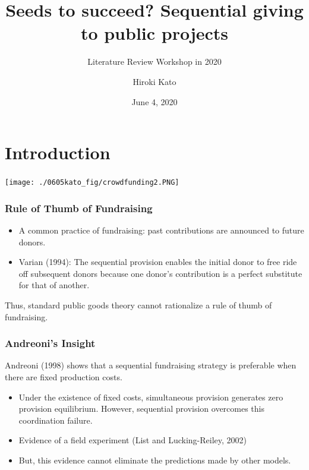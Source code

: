 \documentclass[unicode,12pt]{beamer}
\title{Seeds to succeed? Sequential giving to public projects}
\subtitle{Literature Review Workshop in 2020}
\author{Hiroki Kato}
\date{June 4, 2020}
\begin{document}
    \maketitle

    \section{Introduction}

    \begin{frame}
        \frametitle{}

        \centerline{\texttt{[image: ./0605kato\_fig/crowdfunding2.PNG]}}
        
    \end{frame}

    \begin{frame}
        \frametitle{Rule of Thumb of Fundraising}
    
        \begin{itemize}
            \item A common practice of fundraising: past contributions are announced to future donors.
            \item Varian (1994): The sequential provision enables the initial donor to free ride off subsequent donors because one donor's contribution is a perfect substitute for that of another. 
        \end{itemize}
        Thus, standard public goods theory cannot rationalize a rule of thumb of fundraising.
    
    \end{frame}

    \begin{frame}
        \frametitle{Andreoni's Insight}
    
        Andreoni (1998) shows that a sequential fundraising strategy is preferable when there are fixed production costs.
        \begin{itemize}
            \item Under the existence of fixed costs, simultaneous provision generates zero provision equilibrium. However, sequential provision overcomes this coordination failure.
            \item Evidence of a field experiment (List and Lucking-Reiley, 2002)
            \item But, this evidence cannot eliminate the predictions made by other models.
        \end{itemize}
    
    \end{frame}
\end{document}
